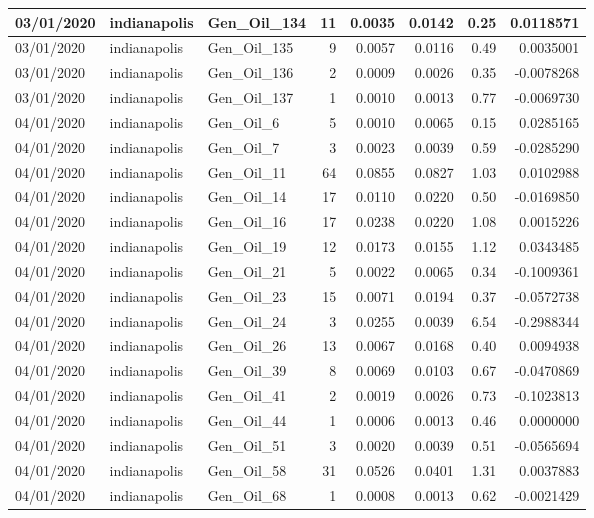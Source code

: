 \documentclass[
  letterpaper,
  DIV=11,
  numbers=noendperiod]{scrartcl}
\begin{document}
\begin{tabular}{l|l|l|r|r|r|r|r}
\hline
03/01/2020 & indianapolis & Gen\_Oil\_134 & 11 & 0.0035 & 0.0142 & 0.25 & 0.0118571\\
\hline
03/01/2020 & indianapolis & Gen\_Oil\_135 & 9 & 0.0057 & 0.0116 & 0.49 & 0.0035001\\
\hline
03/01/2020 & indianapolis & Gen\_Oil\_136 & 2 & 0.0009 & 0.0026 & 0.35 & -0.0078268\\
\hline
03/01/2020 & indianapolis & Gen\_Oil\_137 & 1 & 0.0010 & 0.0013 & 0.77 & -0.0069730\\
\hline
04/01/2020 & indianapolis & Gen\_Oil\_6 & 5 & 0.0010 & 0.0065 & 0.15 & 0.0285165\\
\hline
04/01/2020 & indianapolis & Gen\_Oil\_7 & 3 & 0.0023 & 0.0039 & 0.59 & -0.0285290\\
\hline
04/01/2020 & indianapolis & Gen\_Oil\_11 & 64 & 0.0855 & 0.0827 & 1.03 & 0.0102988\\
\hline
04/01/2020 & indianapolis & Gen\_Oil\_14 & 17 & 0.0110 & 0.0220 & 0.50 & -0.0169850\\
\hline
04/01/2020 & indianapolis & Gen\_Oil\_16 & 17 & 0.0238 & 0.0220 & 1.08 & 0.0015226\\
\hline
04/01/2020 & indianapolis & Gen\_Oil\_19 & 12 & 0.0173 & 0.0155 & 1.12 & 0.0343485\\
\hline
04/01/2020 & indianapolis & Gen\_Oil\_21 & 5 & 0.0022 & 0.0065 & 0.34 & -0.1009361\\
\hline
04/01/2020 & indianapolis & Gen\_Oil\_23 & 15 & 0.0071 & 0.0194 & 0.37 & -0.0572738\\
\hline
04/01/2020 & indianapolis & Gen\_Oil\_24 & 3 & 0.0255 & 0.0039 & 6.54 & -0.2988344\\
\hline
04/01/2020 & indianapolis & Gen\_Oil\_26 & 13 & 0.0067 & 0.0168 & 0.40 & 0.0094938\\
\hline
04/01/2020 & indianapolis & Gen\_Oil\_39 & 8 & 0.0069 & 0.0103 & 0.67 & -0.0470869\\
\hline
04/01/2020 & indianapolis & Gen\_Oil\_41 & 2 & 0.0019 & 0.0026 & 0.73 & -0.1023813\\
\hline
04/01/2020 & indianapolis & Gen\_Oil\_44 & 1 & 0.0006 & 0.0013 & 0.46 & 0.0000000\\
\hline
04/01/2020 & indianapolis & Gen\_Oil\_51 & 3 & 0.0020 & 0.0039 & 0.51 & -0.0565694\\
\hline
04/01/2020 & indianapolis & Gen\_Oil\_58 & 31 & 0.0526 & 0.0401 & 1.31 & 0.0037883\\
\hline
04/01/2020 & indianapolis & Gen\_Oil\_68 & 1 & 0.0008 & 0.0013 & 0.62 & -0.0021429\\

\end{tabular}
\end{document}
